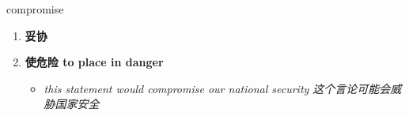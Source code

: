 
\begin{frame}
{\huge compromise}
\begin{center}
\begin{enumerate}\Large
  \item \textbf{妥协}
  \item \textbf{使危险 to place in danger}
  \begin{itemize}
    \item \em{\Large{this statement would compromise our national security 这个言论可能会威胁国家安全}}
  \end{itemize}
\end{enumerate}
\end{center}
\end{frame}
